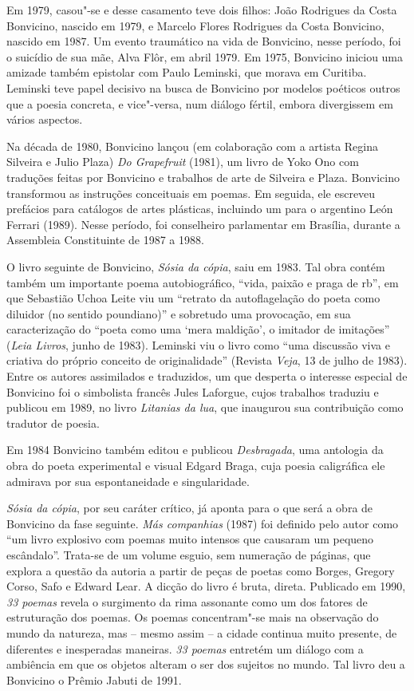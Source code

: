 Em 1979, casou"-se e desse casamento teve dois filhos: João Rodrigues da
Costa Bonvicino, nascido em 1979, e Marcelo Flores Rodrigues da Costa
Bonvicino, nascido em 1987. Um evento traumático na vida de Bonvicino,
nesse período, foi o suicídio de sua mãe, Alva Flôr, em abril 1979. Em
1975, Bonvicino iniciou uma amizade também epistolar com Paulo Leminski,
que morava em Curitiba. Leminski teve papel decisivo na busca de
Bonvicino por modelos poéticos outros que a poesia concreta, e
vice"-versa, num diálogo fértil, embora divergissem em vários aspectos.

Na década de 1980, Bonvicino lançou (em colaboração com a artista Regina
Silveira e Julio Plaza) \emph{Do Grapefruit} (1981), um livro de Yoko
Ono com traduções feitas por Bonvicino e trabalhos de arte de Silveira e
Plaza. Bonvicino transformou as instruções conceituais em poemas. Em
seguida, ele escreveu prefácios para catálogos de artes plásticas,
incluindo um para o argentino León Ferrari (1989). Nesse período, foi
conselheiro parlamentar em Brasília, durante a Assembleia Constituinte
de 1987 a 1988.

O livro seguinte de Bonvicino, \emph{Sósia da cópia}, saiu em 1983. Tal
obra contém também um importante poema autobiográfico, ``vida, paixão e
praga de rb'', em que Sebastião Uchoa Leite viu um ``retrato da
autoflagelação do poeta como diluidor (no sentido poundiano)'' e
sobretudo uma provocação, em sua caracterização do ``poeta como uma
`mera maldição', o imitador de imitações'' (\emph{Leia Livros}, junho de
1983). Leminski viu o livro como ``uma discussão viva e criativa do
próprio conceito de originalidade'' (Revista \emph{Veja}, 13 de julho de
1983). Entre os autores assimilados e traduzidos, um que desperta o
interesse especial de Bonvicino foi o simbolista francês Jules Laforgue,
cujos trabalhos traduziu e publicou em 1989, no livro \emph{Litanias da
lua}, que inaugurou sua contribuição como tradutor de poesia.

Em 1984 Bonvicino também editou e publicou \emph{Desbragada}, uma
antologia da obra do poeta experimental e visual Edgard Braga, cuja
poesia caligráfica ele admirava por sua espontaneidade e singularidade.

\emph{Sósia da cópia}, por seu caráter crítico, já aponta para o que
será a obra de Bonvicino da fase seguinte. \emph{Más companhias} (1987)
foi definido pelo autor como ``um livro explosivo com poemas muito
intensos que causaram um pequeno escândalo''. Trata-se de um volume
esguio, sem numeração de páginas, que explora a questão da autoria a
partir de peças de poetas como Borges, Gregory Corso, Safo e Edward
Lear. A dicção do livro é bruta, direta. Publicado em 1990, \emph{33
poemas} revela o surgimento da rima assonante como um dos fatores de
estruturação dos poemas. Os poemas concentram"-se mais na observação do
mundo da natureza, mas -- mesmo assim -- a cidade continua muito
presente, de diferentes e inesperadas maneiras. \emph{33 poemas}
entretém um diálogo com a ambiência em que os objetos alteram o ser dos
sujeitos no mundo. Tal livro deu a Bonvicino o Prêmio Jabuti de 1991.

